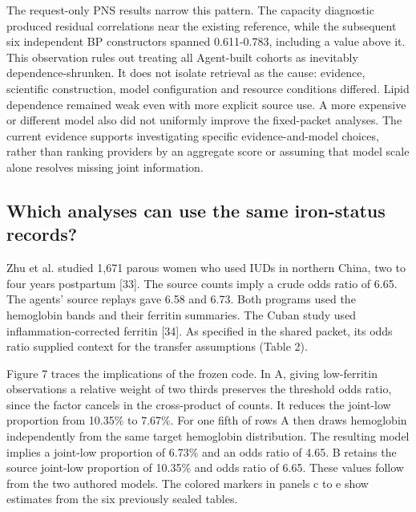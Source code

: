 \documentclass[11pt,letterpaper]{article}
\begin{document}
The request-only PNS results narrow this pattern. The capacity diagnostic produced residual correlations near the existing reference, while the subsequent six independent BP constructors spanned 0.611-0.783, including a value above it. This observation rules out treating all Agent-built cohorts as inevitably dependence-shrunken. It does not isolate retrieval as the cause: evidence, scientific construction, model configuration and resource conditions differed. Lipid dependence remained weak even with more explicit source use. A more expensive or different model also did not uniformly improve the fixed-packet analyses. The current evidence supports investigating specific evidence-and-model choices, rather than ranking providers by an aggregate score or assuming that model scale alone resolves missing joint information.


\subsection{Which analyses can use the same iron-status records?}

Zhu et al. studied 1,671 parous women who used IUDs in northern China, two to four years postpartum [33]. The source counts imply a crude odds ratio of 6.65. The agents' source replays gave 6.58 and 6.73. Both programs used the hemoglobin bands and their ferritin summaries. The Cuban study used inflammation-corrected ferritin [34]. As specified in the shared packet, its odds ratio supplied context for the transfer assumptions (Table 2).


Figure 7 traces the implications of the frozen code. In A, giving low-ferritin observations a relative weight of two thirds preserves the threshold odds ratio, since the factor cancels in the cross-product of counts. It reduces the joint-low proportion from 10.35\% to 7.67\%. For one fifth of rows A then draws hemoglobin independently from the same target hemoglobin distribution. The resulting model implies a joint-low proportion of 6.73\% and an odds ratio of 4.65. B retains the source joint-low proportion of 10.35\% and odds ratio of 6.65. These values follow from the two authored models. The colored markers in panels c to e show estimates from the six previously sealed tables.
\end{document}
